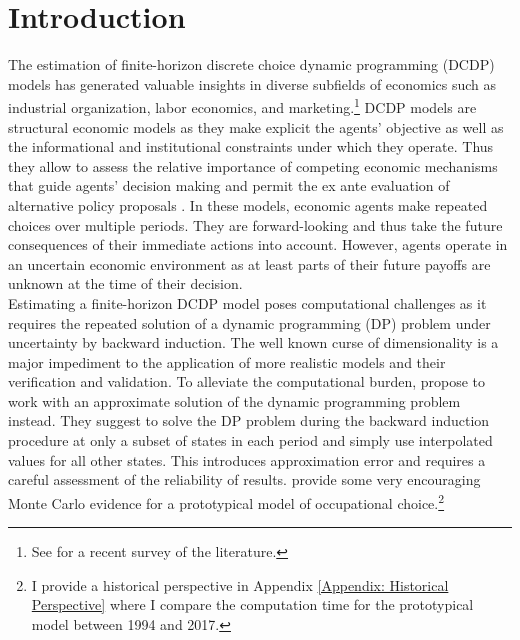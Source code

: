 \section{Introduction}
The estimation of finite-horizon discrete choice dynamic programming (DCDP) models has generated valuable insights in diverse subfields of economics such as industrial organization, labor economics, and marketing.\footnote{See \citet{Keane.2011d} for a recent survey of the literature.} DCDP models are structural economic models as they make explicit the agents' objective as well as the informational and institutional constraints under which they operate. Thus they allow to assess the relative importance of competing economic mechanisms that guide agents' decision making and permit the ex ante evaluation of alternative policy proposals \citep{Wolpin.2013}. In these models, economic agents make repeated choices over multiple periods. They are forward-looking and thus take the future consequences of their immediate actions into account. However, agents operate in an uncertain economic environment as at least parts of their future payoffs are unknown at the time of their decision.\\\newline
%
Estimating a finite-horizon DCDP model poses computational challenges as it requires the repeated solution of a dynamic programming (DP) problem under uncertainty by backward induction. The well known curse of dimensionality \citep{Bellman.1957} is a major impediment to the application of more realistic models and their verification and validation. To alleviate the computational burden, \citet{Keane.1994} propose to work with an approximate solution of the dynamic programming problem instead. They suggest to solve the DP problem during the backward induction procedure at only a subset of states in each period and simply use interpolated values for all other states. This introduces approximation error and requires a careful assessment of the reliability of results. \citet{Keane.1994} provide some very encouraging Monte Carlo evidence for a prototypical model of occupational choice.\footnote{I provide a historical perspective in Appendix \ref{Appendix: Historical Perspective} where I compare the computation time for the prototypical model between 1994 and 2017.}\\\newline
%
